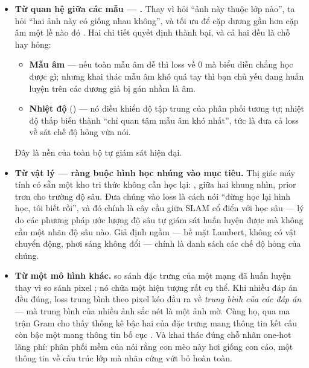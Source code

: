 \documentclass[../../deep_learning.tex]{subfiles}
\begin{document}
\begin{itemize}
\item \textbf{Từ quan hệ giữa các mẫu --- .} Thay vì hỏi ``ảnh này thuộc lớp nào'', ta hỏi ``hai ảnh này có giống nhau không'', và tối ưu để cặp dương gần hơn cặp âm một lề nào đó \cite{schroff2015facenet, oord2018cpc}. Hai chi tiết quyết định thành bại, và cả hai đều là chỗ hay hỏng:
  \begin{itemize}
  \item \textbf{Mẫu âm} --- nếu toàn mẫu âm dễ thì loss về 0 mà biểu diễn chẳng học được gì; nhưng khai thác mẫu âm khó quá tay thì bạn chủ yếu đang huấn luyện trên các dương giả bị gán nhầm là âm.
  \item \textbf{Nhiệt độ} () --- nó điều khiển độ tập trung của phân phối tương tự; nhiệt độ thấp biến  thành ``chỉ quan tâm mẫu âm khó nhất'', tức là đưa cả loss về sát chế độ hỏng vừa nói.
  \end{itemize}
  Đây là nền của toàn bộ tự giám sát hiện đại.
\item \textbf{Từ vật lý --- ràng buộc hình học nhúng vào mục tiêu.} Thị giác máy tính có sẵn một kho tri thức không cần học lại: ,  giữa hai khung nhìn, prior trơn cho trường độ sâu. Đưa chúng vào loss là cách nói ``đừng học lại hình học, tôi biết rồi'',  và đó chính là cây cầu giữa SLAM cổ điển với học sâu --- lý do các phương pháp ước lượng độ sâu tự giám sát huấn luyện được mà không cần một nhãn độ sâu nào. Giả định ngầm --- bề mặt Lambert, không có vật chuyển động, phơi sáng không đổi --- chính là danh sách các chế độ hỏng của chúng.
\item \textbf{Từ một mô hình khác.}  so sánh đặc trưng của một mạng đã huấn luyện thay vì so sánh pixel \cite{johnson2016perceptual, zhang2018lpips}; nó chữa một hiện tượng rất cụ thể. Khi nhiều đáp án đều đúng, loss trung bình theo pixel kéo đầu ra về \emph{trung bình của các đáp án} --- mà trung bình của nhiều ảnh sắc nét là một ảnh mờ. Cùng họ,  qua ma trận Gram cho thấy thống kê bậc hai của đặc trưng mang thông tin kết cấu còn bậc một mang thông tin bố cục \cite{gatys2016style}. Và  \cite{hinton2015distilling} khai thác đúng chỗ nhãn one-hot lãng phí: phân phối mềm của  nói rằng con mèo này hơi giống con cáo, một thông tin về cấu trúc lớp mà nhãn cứng vứt bỏ hoàn toàn.
\end{itemize}
\end{document}
